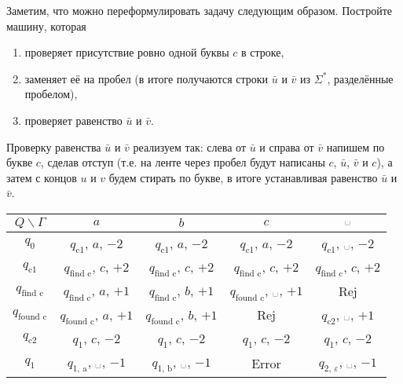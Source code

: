 \documentclass[12pt,a4paper]{article}
\newcommand{\spacesymbol}{\ensuremath{\text{\textvisiblespace}}}
\begin{document}
    \addtocounter{enumprb}{1}

    \begin{enumproblem}
        Заметим, что можно переформулировать задачу следующим образом. Постройте машину, которая
        \begin{enumerate}
            \item проверяет присутствие ровно одной буквы $c$ в строке,
            \item заменяет её на пробел (в итоге получаются строки $\bar{u}$ и $\bar{v}$ из $\Sigma^*$, разделённые пробелом),
            \item проверяет равенство $\bar{u}$ и $\bar{v}$.
        \end{enumerate}
        Проверку равенства $\bar{u}$ и $\bar{v}$ реализуем так: слева от $\bar{u}$ и справа от $\bar{v}$ напишем по букве $c$, сделав отступ (т.е. на ленте через пробел будут написаны $c$, $\bar{u}$, $\bar{v}$ и $c$), а затем с концов $u$ и $v$ будем стирать по букве, в итоге устанавливая равенство $\bar{u}$ и $\bar{v}$.
        \begin{table}[H]
            \centering
            \begin{tabular}{c||c|c|c|c}
                $Q\backslash\Gamma$& $a$& $b$& $c$& \spacesymbol\\
                \hline
                \hline
                $q_0$& $q_{\text{c1}}$, $a$, $-2$& $q_{\text{c1}}$, $a$, $-2$& $q_{\text{c1}}$, $a$, $-2$& $q_{\text{c1}}$, \spacesymbol, $-2$\\
                \hline
                $q_{\text{c1}}$& $q_{\text{find c}}$, $c$, $+2$& $q_{\text{find c}}$, $c$, $+2$& $q_{\text{find c}}$, $c$, $+2$& $q_{\text{find c}}$, $c$, $+2$\\
                \hline
                $q_{\text{find c}}$& $q_{\text{find c}}$, $a$, $+1$& $q_{\text{find c}}$, $b$, $+1$& $q_{\text{found c}}$, \spacesymbol, $+1$& Rej\\
                \hline
                $q_{\text{found c}}$& $q_{\text{found c}}$, $a$, $+1$& $q_{\text{found c}}$, $b$, $+1$& Rej& $q_{\text{c2}}$, \spacesymbol, $+1$\\
                \hline
                $q_{\text{c2}}$& $q_{\text{1}}$, $c$, $-2$& $q_{\text{1}}$, $c$, $-2$& $q_{\text{1}}$, $c$, $-2$& $q_{\text{1}}$, $c$, $-2$\\
                \hline
                $q_{\text{1}}$& $q_{\text{1, a}}$, \spacesymbol, $-1$& $q_{\text{1, b}}$, \spacesymbol, $-1$& Error& $q_{\text{2, $\varepsilon$}}$, \spacesymbol, $-1$\\

\end{tabular}
\end{table}
\end{enumproblem}
\end{document}
